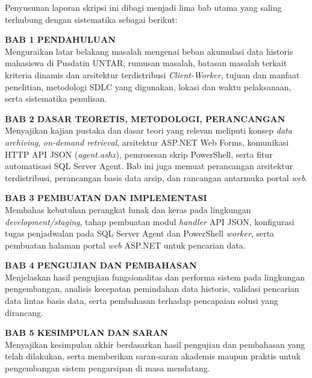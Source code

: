 Penyusunan laporan skripsi ini dibagi menjadi lima bab utama yang saling terhubung dengan sistematika sebagai berikut:

\noindent\textbf{BAB 1 PENDAHULUAN}
\\ Menguraikan latar belakang masalah mengenai beban akumulasi data historis mahasiswa di Pusdatin UNTAR, rumusan masalah, batasan masalah terkait kriteria dinamis dan arsitektur terdistribusi \textit{Client-Worker}, tujuan dan manfaat penelitian, metodologi SDLC yang digunakan, lokasi dan waktu pelaksanaan, serta sistematika penulisan.

\noindent\textbf{BAB 2 DASAR TEORETIS, METODOLOGI, PERANCANGAN}
\\ Menyajikan kajian pustaka dan dasar teori yang relevan meliputi konsep \textit{data archiving}, \textit{on-demand retrieval}, arsitektur ASP.NET Web Forms, komunikasi HTTP API JSON (\textit{agent.ashx}), pemrosesan skrip PowerShell, serta fitur automatisasi SQL Server Agent. Bab ini juga memuat perancangan arsitektur terdistribusi, perancangan basis data arsip, dan rancangan antarmuka portal \textit{web}.

\noindent\textbf{BAB 3 PEMBUATAN DAN IMPLEMENTASI}
\\ Membahas kebutuhan perangkat lunak dan keras pada lingkungan \textit{development/staging}, tahap pembuatan modul \textit{handler} API JSON, konfigurasi tugas penjadwalan pada SQL Server Agent dan PowerShell \textit{worker}, serta pembuatan halaman portal \textit{web} ASP.NET untuk pencarian data.

\noindent\textbf{BAB 4 PENGUJIAN DAN PEMBAHASAN}
\\ Menjelaskan hasil pengujian fungsionalitas dan performa sistem pada lingkungan pengembangan, analisis kecepatan pemindahan data historis, validasi pencarian data lintas basis data, serta pembahasan terhadap pencapaian solusi yang dirancang.

\noindent\textbf{BAB 5 KESIMPULAN DAN SARAN}
\\ Menyajikan kesimpulan akhir berdasarkan hasil pengujian dan pembahasan yang telah dilakukan, serta memberikan saran-saran akademis maupun praktis untuk pengembangan sistem pengarsipan di masa mendatang.